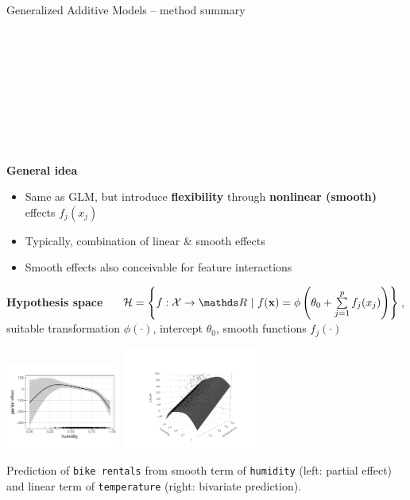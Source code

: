\documentclass[11pt,compress,t,notes=noshow, xcolor=table]{beamer}
\newcommand{\highlight}[1]{\textcolor{hlcol}{\textbf{#1}}}
\newcommand{\maketag}[2][100]{
  \colorbox{hlcol!#1}{\textcolor{white}{\MakeUppercase{\scriptsize #2}} 
  \vphantom{}}
}
\begin{document}
\begin{frame2}{Generalized Additive Models -- method summary}
\maketag{regression} \maketag{classification} \maketag[50]{(NON)PARAMETRIC}
\maketag[50]{WHITE-BOX} \maketag[50]{Feature selection}

\highlight{General idea}
\begin{itemize}
  \item Same as GLM, but introduce \textbf{flexibility} through
  \textbf{nonlinear (smooth)} effects $f_j(x_j)$
  \item Typically, combination of linear \& smooth effects
  \item Smooth effects also conceivable for feature interactions
\end{itemize}

\highlight{Hypothesis space} ~~
$\Hspace = \left\{f: \Xspace \to \R ~|~\fx = \phi \left(\theta_0 + \textstyle \sumjp
f_j(x_j) \right) \right\}$,
suitable transformation $\phi(\cdot)$, intercept $\theta_0$, smooth
functions $f_j(\cdot)$

\includegraphics[width=0.28\textwidth]{figure/gam_bike_partial_effect}
\includegraphics[width=0.35\textwidth, trim=0 0 0 80, clip]{figure/gam_bike_pred}

\tiny
Prediction of \texttt{bike rentals} from smooth term of \texttt{humidity}
(left: partial effect) and linear term of \texttt{temperature} (right: bivariate
prediction).
\normalsize

\end{frame2}
\end{document}
